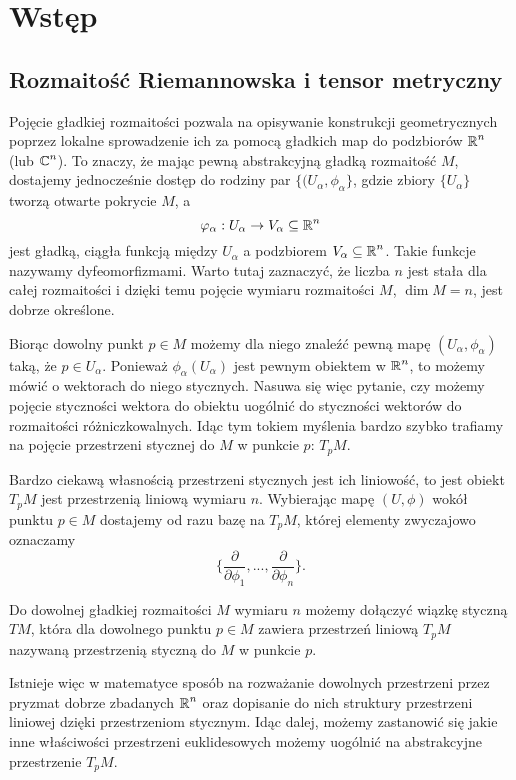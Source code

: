 \section{Wstęp}

\subsection{Rozmaitość Riemannowska i tensor metryczny}

Pojęcie gładkiej rozmaitości pozwala na opisywanie konstrukcji geometrycznych poprzez lokalne sprowadzenie ich za pomocą gładkich map do podzbiorów $\operatorname{\mathbb{R}}^n$ (lub $\operatorname{\mathbb{C}}^n$). To znaczy, że mając pewną abstrakcyjną gładką rozmaitość $M$, dostajemy jednocześnie dostęp do rodziny par $\{(U_\alpha,\phi_\alpha\}$, gdzie zbiory $\{U_\alpha\}$ tworzą otwarte pokrycie $M$, a 
$$\varphi_\alpha:U_\alpha\to V_\alpha\subseteq \operatorname{\mathbb{R}}^n$$
jest gładką, ciągła funkcją między $U_\alpha$ a podzbiorem $V_\alpha\subseteq\operatorname{\mathbb{R}}^n$. Takie funkcje nazywamy dyfeomorfizmami. Warto tutaj zaznaczyć, że liczba $n$ jest stała dla całej rozmaitości i dzięki temu pojęcie wymiaru rozmaitości $M$, $\dim M=n$, jest dobrze określone.

Biorąc dowolny punkt $p\in M$ możemy dla niego znaleźć pewną mapę $(U_\alpha,\phi_\alpha)$ taką, że $p\in U_\alpha$. Ponieważ $\phi_\alpha(U_\alpha)$ jest pewnym obiektem w $\operatorname{\mathbb{R}}^n$, to możemy mówić o wektorach do niego stycznych. Nasuwa się więc pytanie, czy możemy pojęcie styczności wektora do obiektu uogólnić do styczności wektorów do rozmaitości różniczkowalnych. Idąc tym tokiem myślenia bardzo szybko trafiamy na pojęcie przestrzeni stycznej do $M$ w punkcie $p$: $T_pM$. 

Bardzo ciekawą własnością przestrzeni stycznych jest ich liniowość, to jest obiekt $T_pM$ jest przestrzenią liniową wymiaru $n$. Wybierając mapę $(U, \phi)$ wokół punktu $p\in M$ dostajemy od razu bazę na $T_pM$, której elementy zwyczajowo oznaczamy
$$\{ \frac{\partial}{\partial\phi_1} , ... , \frac{\partial}{\partial\phi_n} \}.$$








Do dowolnej gładkiej rozmaitości $M$ wymiaru $n$ możemy dołączyć wiązkę styczną $TM$, która dla dowolnego punktu $p\in M$ zawiera przestrzeń liniową $T_pM$ nazywaną przestrzenią styczną do $M$ w punkcie $p$. 

Istnieje więc w matematyce sposób na rozważanie dowolnych przestrzeni przez pryzmat dobrze zbadanych $\operatorname{\mathbb{R}}^n$ oraz dopisanie do nich struktury przestrzeni liniowej dzięki przestrzeniom stycznym. Idąc dalej, możemy zastanowić się jakie inne właściwości przestrzeni euklidesowych możemy uogólnić na abstrakcyjne przestrzenie $T_pM$.

